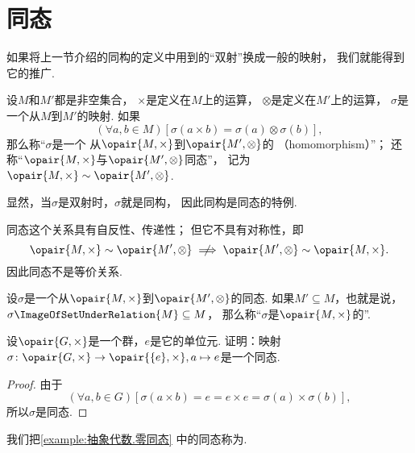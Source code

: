 \section{同态}
如果将上一节介绍的同构的定义中用到的“双射”换成一般的映射，
我们就能得到它的推广.

\begin{definition}
设\(M\)和\(M'\)都是非空集合，
\(\times\)是定义在\(M\)上的运算，
\(\otimes\)是定义在\(M'\)上的运算，
\(\sigma\)是一个从\(M\)到\(M'\)的映射.
如果\[
	(\forall a,b \in M)[
		\sigma(a \times b) = \sigma(a) \otimes \sigma(b)
	],
\]
那么称“\(\sigma\)是一个%
从\(\opair{M,\times}\)到\(\opair{M',\otimes}\)的%
（homomorphism）”；
还称“\(\opair{M,\times}\)与\(\opair{M',\otimes}\)同态”，
记为\(\opair{M,\times} \sim \opair{M',\otimes}\).
\end{definition}

显然，当\(\sigma\)是双射时，\(\sigma\)就是同构，
因此同构是同态的特例.

同态这个关系具有自反性、传递性；
但它不具有对称性，即\[
	\opair{M,\times}\sim\opair{M',\otimes}
	\notimplies
	\opair{M',\otimes}\sim\opair{M,\times}.
\]
因此同态不是等价关系.

\begin{definition}
设\(\sigma\)是一个从\(\opair{M,\times}\)到\(\opair{M',\otimes}\)的同态.
如果\(M' \subseteq M\)，也就是说，\(\sigma\ImageOfSetUnderRelation{M}\subseteq M\)，
那么称“\(\sigma\)是\(\opair{M,\times}\)的”.
\end{definition}

\begin{example}\label{example:抽象代数.零同态}
设\(\opair{G,\times}\)是一个群，\(e\)是它的单位元.
证明：映射\(\sigma\colon\opair{G,\times}\to\opair{\{e\},\times},a\mapsto e\)是一个同态.
\begin{proof}
由于\[
	(\forall a,b\in G)[
		\sigma(a \times b)
		= e
		= e \times e
		= \sigma(a) \times \sigma(b)
	],
\]
所以\(\sigma\)是同态.
\end{proof}
\end{example}
我们把\cref{example:抽象代数.零同态} 中的同态称为.
